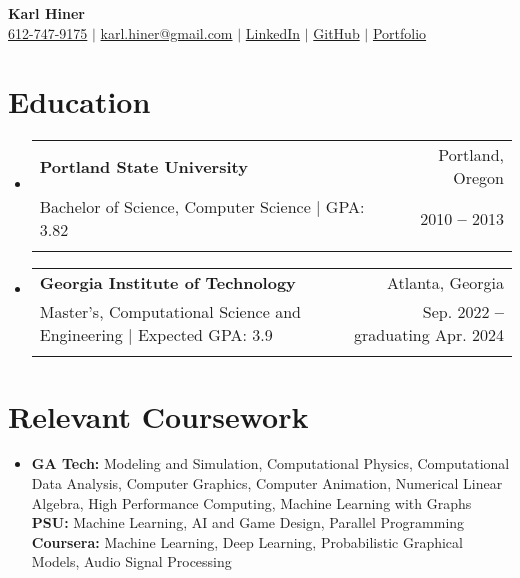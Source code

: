 \documentclass[letterpaper,11pt]{article}
\makeatletter
\newcommand{\resumeItem}[1]{
  \item\small{
    {#1 \vspace{-2pt}}
  }
}
\newcommand{\resumeEducationHeading}[6]{
  \vspace{-2pt}\item
    \begin{tabular*}{0.97\textwidth}[t]{l@{\extracolsep{\fill}}r}
      \textbf{#1} & \small #2 \\
      \small#3 & \small #4 \\
      \small#5 & \small #6 \\
    \end{tabular*}\vspace{-1.75em}
}
\newcommand{\resumeSubHeadingListStart}{\begin{itemize}[leftmargin=0.15in, label={}]}
\newcommand{\resumeSubHeadingListEnd}{\end{itemize}}
\makeatother
\begin{document}

\hypersetup{urlcolor = black} %

\begin{center}
    \textbf{\Huge Karl Hiner} \\ \vspace{3pt}
    \small
    \faMobile \hspace{.5pt} \href{tel:6127479175}{612-747-9175}
    $|$
    \faAt \hspace{.5pt} \href{mailto:karl.hiner@gmail.com}{karl.hiner@gmail.com}
    $|$
    \faLinkedinSquare \hspace{.5pt} \href{https://www.linkedin.com/in/karl-hiner/}{LinkedIn}
    $|$
    \faGithub \hspace{.5pt} \href{https://github.com/khiner}{GitHub}
    $|$
    \faGlobe \hspace{.5pt} \href{https://karlhiner.com}{Portfolio}
\end{center}
\vspace{-18pt}

\hypersetup{urlcolor = linkcolor} %

\section{Education}
  \vspace{1pt}
  \resumeSubHeadingListStart
    \resumeEducationHeading
      {Portland State University}{Portland, Oregon}
      {Bachelor of Science, Computer Science $|$ \footnotesize{GPA: 3.82}}{2010 \textbf{--} 2013}{}{}
    \resumeEducationHeading
      {Georgia Institute of Technology}{Atlanta, Georgia}
      {Master's, Computational Science and Engineering $|$ \footnotesize{Expected GPA: 3.9}}{Sep. 2022 \textbf{--} graduating Apr. 2024}{}{}
  \resumeSubHeadingListEnd

\section{Relevant Coursework}
  \resumeSubHeadingListStart
    \resumeItem{
      \textbf{GA Tech:}{ Modeling and Simulation, Computational Physics, Computational Data Analysis, Computer Graphics, Computer Animation, Numerical Linear Algebra, High Performance Computing, Machine Learning with Graphs} \\ \vspace{3pt}
      \textbf{PSU:}{ Machine Learning, AI and Game Design, Parallel Programming} \\ \vspace{3pt}
      \textbf{Coursera:}{ Machine Learning, Deep Learning, Probabilistic Graphical Models, Audio Signal Processing} \\ \vspace{3pt}
    }
    \resumeSubHeadingListEnd
\end{document}
